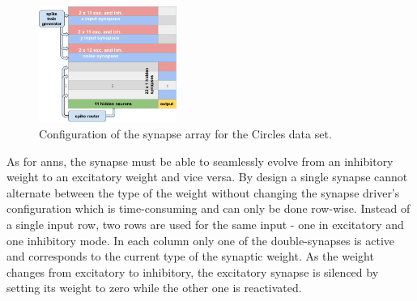 %	
\begin{figure}
	\centering
	\vspace{-0.5cm}
	\includegraphics[width=0.4\textwidth]{figures/overview_circles_synapses3.png}
	\caption[Configuration of the synapse array for the Circles data set.]{Configuration of the synapse array for the Circles data set. } 
	\label{overview_circles_synapses}
	\vspace{-.5cm}
\end{figure}
As for \glspl{ann}, the synapse must be able to seamlessly evolve from an inhibitory weight to an excitatory weight and vice versa. By design a single synapse cannot alternate between the type of the weight without changing the synapse driver's configuration which is time-consuming and can only be done row-wise. Instead of a single input row, two rows are used for the same input - one in excitatory and one inhibitory mode. In each column only one of the double-synapses is active and corresponds to the current type of the synaptic weight. As the weight changes from excitatory to inhibitory, the excitatory synapse is silenced by setting its weight to zero while the other one is reactivated.

